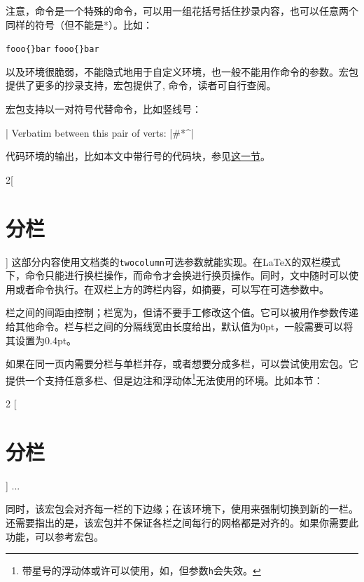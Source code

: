 注意，命令是一个特殊的命令，可以用一组花括号括住抄录内容，也可以任意两个同样的符号（但不能是*）。比如：
\begin{latex}
\verb|fooo{}bar|
\verb+fooo{}bar+
\end{latex}

以及环境很脆弱，不能隐式地用于自定义环境，也一般不能用作命令的参数。宏包提供了更多的抄录支持，宏包提供了, 命令，读者可自行查阅。

宏包支持以一对符号代替命令，比如竖线号：
\begin{latex}
\MakeShortVerb|
Verbatim between this pair of verts: |#\?*^|
\end{latex}

代码环境的输出，比如本文中带行号的代码块，参见\hyperref[sec:coding]{这一节}。

\begin{multicols}{2}[\section{分栏}]
这部分内容使用文档类的\texttt{two\-column}可选参数就能实现。在\LaTeX 的双栏模式下，命令只能进行换栏操作，而命令才会换进行换页操作。同时，文中随时可以使用或者命令执行。在双栏上方的跨栏内容，如摘要，可以写在可选参数中。

栏之间的间距由控制；栏宽为，但请不要手工修改这个值。它可以被用作参数传递给其他命令。栏与栏之间的分隔线宽由长度给出，默认值为0pt，一般需要可以将其设置为0.4pt。 

如果在同一页内需要分栏与单栏并存，或者想要分成多栏，可以尝试使用宏包。它提供一个支持任意多栏、但是边注和浮动体\footnote{带星号的浮动体或许可以使用，如，但参数\texttt{h}会失效。}无法使用的环境。比如本节：
\begin{latex}
\begin{multicols}{2}
  [\section{分栏}]
  ...
\end{multicols}
\end{latex}

同时，该宏包会对齐每一栏的下边缘；在该环境下，使用来强制切换到新的一栏。还需要指出的是，该宏包并不保证各栏之间每行的网格都是对齐的。如果你需要此功能，可以参考宏包。
\end{multicols}

